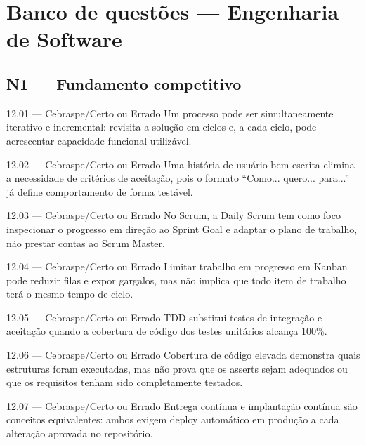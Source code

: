 \section{Banco de questões — Engenharia de Software}

\subsection*{N1 — Fundamento competitivo}

\begin{questao}{ 12.01 — Cebraspe/Certo ou Errado}
Um processo pode ser simultaneamente iterativo e incremental: revisita a solução em ciclos e, a cada ciclo, pode acrescentar capacidade funcional utilizável.
\end{questao}

\begin{questao}{ 12.02 — Cebraspe/Certo ou Errado}
Uma história de usuário bem escrita elimina a necessidade de critérios de aceitação, pois o formato ``Como... quero... para...'' já define comportamento de forma testável.
\end{questao}

\begin{questao}{ 12.03 — Cebraspe/Certo ou Errado}
No Scrum, a Daily Scrum tem como foco inspecionar o progresso em direção ao Sprint Goal e adaptar o plano de trabalho, não prestar contas ao Scrum Master.
\end{questao}

\begin{questao}{ 12.04 — Cebraspe/Certo ou Errado}
Limitar trabalho em progresso em Kanban pode reduzir filas e expor gargalos, mas não implica que todo item de trabalho terá o mesmo tempo de ciclo.
\end{questao}

\begin{questao}{ 12.05 — Cebraspe/Certo ou Errado}
TDD substitui testes de integração e aceitação quando a cobertura de código dos testes unitários alcança 100\%.
\end{questao}

\begin{questao}{ 12.06 — Cebraspe/Certo ou Errado}
Cobertura de código elevada demonstra quais estruturas foram executadas, mas não prova que os asserts sejam adequados ou que os requisitos tenham sido completamente testados.
\end{questao}

\begin{questao}{ 12.07 — Cebraspe/Certo ou Errado}
Entrega contínua e implantação contínua são conceitos equivalentes: ambos exigem deploy automático em produção a cada alteração aprovada no repositório.
\end{questao}

